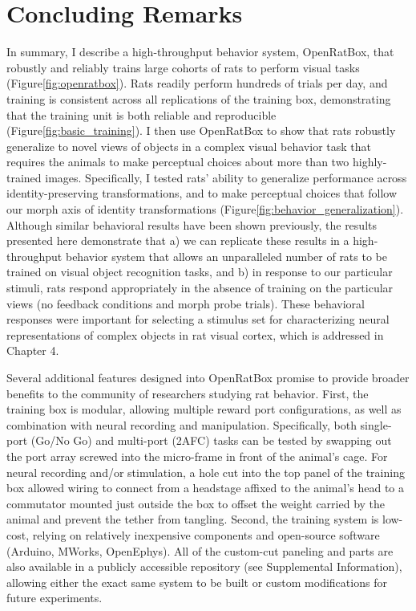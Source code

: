 \section{Concluding Remarks}
In summary, I describe a high-throughput behavior system, OpenRatBox, that robustly and reliably trains large cohorts of rats to perform visual tasks (Figure\ref{fig:openratbox}). Rats readily perform hundreds of trials per day, and training is consistent across all replications of the training box, demonstrating that the training unit is both reliable and reproducible (Figure\ref{fig:basic_training}). I then use OpenRatBox to show that rats robustly generalize to novel views of objects in a complex visual behavior task that requires the animals to make perceptual choices about more than two highly-trained images. Specifically, I tested rats' ability to generalize performance across identity-preserving transformations, and to make perceptual choices that follow our morph axis of identity transformations (Figure\ref{fig:behavior_generalization}). Although similar behavioral results have been shown previously\cite{Zoccolan2009, Tafazoli2012, Vermaercke2012}, the results presented here demonstrate that a) we can replicate these results in a high-throughput behavior system that allows an unparalleled number of rats to be trained on visual object recognition tasks, and b) in response to our particular stimuli, rats respond appropriately in the absence of training on the particular views (no feedback conditions and morph probe trials). These behavioral responses were important for selecting a stimulus set for characterizing neural representations of complex objects in rat visual cortex, which is addressed in Chapter 4. 

Several additional features designed into OpenRatBox promise to provide broader benefits to the community of researchers studying rat behavior. First, the training box is modular, allowing multiple reward port configurations, as well as combination with neural recording and manipulation. Specifically, both single-port (Go/No Go) and multi-port (2AFC) tasks can be tested by swapping out the port array screwed into the micro-frame in front of the animal's cage. For neural recording and/or stimulation, a hole cut into the top panel of the training box allowed wiring to connect from a headstage affixed to the animal's head to a commutator mounted just outside the box to offset the weight carried by the animal and prevent the tether from tangling. Second, the training system is low-cost, relying on relatively inexpensive components and open-source software (Arduino, MWorks, OpenEphys). All of the custom-cut paneling and parts are also available in a publicly accessible repository (see Supplemental Information), allowing either the exact same system to be built or custom modifications for future experiments. 

